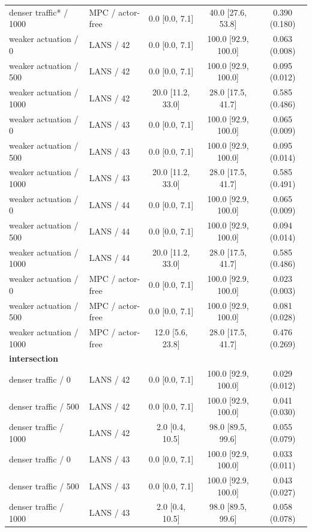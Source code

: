 \begin{longtable}{llccc}
denser traffic* / 1000 & MPC / actor-free & 0.0 [0.0, 7.1] & 40.0 [27.6, 53.8] & 0.390 (0.180) \\
weaker actuation / 0 & LANS / 42 & 0.0 [0.0, 7.1] & 100.0 [92.9, 100.0] & 0.063 (0.008) \\
weaker actuation / 500 & LANS / 42 & 0.0 [0.0, 7.1] & 100.0 [92.9, 100.0] & 0.095 (0.012) \\
weaker actuation / 1000 & LANS / 42 & 20.0 [11.2, 33.0] & 28.0 [17.5, 41.7] & 0.585 (0.486) \\
weaker actuation / 0 & LANS / 43 & 0.0 [0.0, 7.1] & 100.0 [92.9, 100.0] & 0.065 (0.009) \\
weaker actuation / 500 & LANS / 43 & 0.0 [0.0, 7.1] & 100.0 [92.9, 100.0] & 0.095 (0.014) \\
weaker actuation / 1000 & LANS / 43 & 20.0 [11.2, 33.0] & 28.0 [17.5, 41.7] & 0.585 (0.491) \\
weaker actuation / 0 & LANS / 44 & 0.0 [0.0, 7.1] & 100.0 [92.9, 100.0] & 0.065 (0.009) \\
weaker actuation / 500 & LANS / 44 & 0.0 [0.0, 7.1] & 100.0 [92.9, 100.0] & 0.094 (0.014) \\
weaker actuation / 1000 & LANS / 44 & 20.0 [11.2, 33.0] & 28.0 [17.5, 41.7] & 0.585 (0.486) \\
weaker actuation / 0 & MPC / actor-free & 0.0 [0.0, 7.1] & 100.0 [92.9, 100.0] & 0.023 (0.003) \\
weaker actuation / 500 & MPC / actor-free & 0.0 [0.0, 7.1] & 100.0 [92.9, 100.0] & 0.081 (0.028) \\
weaker actuation / 1000 & MPC / actor-free & 12.0 [5.6, 23.8] & 28.0 [17.5, 41.7] & 0.476 (0.269) \\
\multicolumn{5}{l}{\textbf{intersection}} \\
denser traffic / 0 & LANS / 42 & 0.0 [0.0, 7.1] & 100.0 [92.9, 100.0] & 0.029 (0.012) \\
denser traffic / 500 & LANS / 42 & 0.0 [0.0, 7.1] & 100.0 [92.9, 100.0] & 0.041 (0.030) \\
denser traffic / 1000 & LANS / 42 & 2.0 [0.4, 10.5] & 98.0 [89.5, 99.6] & 0.055 (0.079) \\
denser traffic / 0 & LANS / 43 & 0.0 [0.0, 7.1] & 100.0 [92.9, 100.0] & 0.033 (0.011) \\
denser traffic / 500 & LANS / 43 & 0.0 [0.0, 7.1] & 100.0 [92.9, 100.0] & 0.043 (0.027) \\
denser traffic / 1000 & LANS / 43 & 2.0 [0.4, 10.5] & 98.0 [89.5, 99.6] & 0.058 (0.078) \\

\end{longtable}
